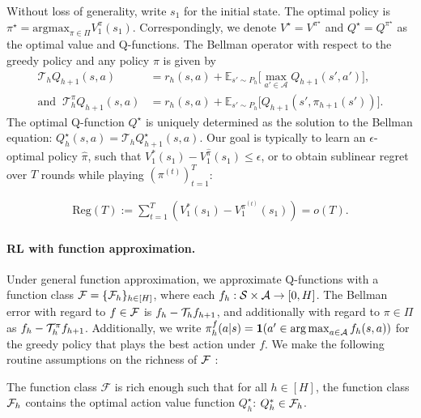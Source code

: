 Without loss of generality, write $s_1$ for the initial state. The optimal policy is $\pi^{\star} = \mathrm{argmax}_{\pi\in\Pi} V_1^{\pi}(s_1)$. Correspondingly, we denote $V^{\star} = V^{\pi^{\star}}$ and $Q^{\star} = Q^{\pi^{\star}}$ as the optimal value and Q-functions. The Bellman operator with respect to the greedy policy and any policy $\pi$ is given by
\begin{subequations}
\begin{align}
    \mathcal{T}_{h}Q_{h+1}(s,a) &= r_h(s,a) + \mathbb{E}_{s'\sim P_h}\Big[\max_{a'\in\mathcal{A}}Q_{h+1}(s',a')\Big],\\
    \text{and }~\mathcal{T}^\pi_{h}Q_{h+1}(s,a) &= r_h(s,a) + \mathbb{E}_{s'\sim P_h}\Big[Q_{h+1}(s',\pi_{h+1}(s'))\Big].
\end{align}
\end{subequations}
The optimal Q-function $Q^{\star}$ is uniquely determined as the solution to the Bellman equation: $Q_{h}^{\star}(s,a)=\mathcal{T}_hQ_{h+1}^{\star}(s,a)$. Our goal is typically to learn an $\epsilon$-optimal policy $\widehat{\pi}$, such that $V_1^*(s_1) - V^{\widehat{\pi}}_1(s_1) \leq \epsilon$, or to obtain sublinear regret over $T$ rounds while playing $(\pi^{(t)})_{t=1}^T$:

\begin{align}
   \text{Reg}(T) := \sum_{t=1}^T \left(V_1^*(s_1) - V^{\pi^{(t)}}_1(s_1)\right) = o(T).
\end{align}


\paragraph{RL with function approximation.} Under general function approximation, we approximate Q-functions with a function class ${\mathcal{F}} = \{{\mathcal{F}}_h\}_{h \in [H]}$, where each $f_h : {\mathcal{S}} \times {\mathcal{A}} \to [0,H]$. The Bellman error with regard to $f \in {\mathcal{F}}$ is $f_h - {\mathcal{T}}_h f_{h+1}$, and additionally with regard to $\pi \in \Pi$ as $f_h - {\mathcal{T}}_h^\pi f_{h+1}$.
Additionally, we write $\pi_h^{f}(a|s) = \mathbf{1}(a' \in \operatorname*{arg\,max}_{a\in {\mathcal{A}}} f_h(s,a))$ for the greedy policy that plays the best action under $f$. We make the following routine assumptions on the richness of ${\mathcal{F}}$ \citep{jin2021bellmaneluder, xie2022role, rajaraman2020fundamental, rashidinejad2021bridging}:

\begin{aspt}[Realizability]
    The function class $\mathcal{F}$ is rich enough such that for all $h\in[H]$, the function class ${\mathcal{F}}_h$ contains the optimal action value function $Q_h^{\star}$: $Q^*_h \in {\mathcal{F}}_h$.
\end{aspt}

